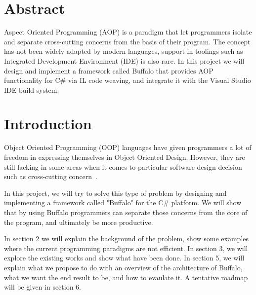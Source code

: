\newcommand{\etc} {\emph{etc.\/}}
\newcommand{\etal}{\emph{et~al.\/}}
\newcommand{\eg}  {\emph{e.g.\/}}
\newcommand{\ie}  {\emph{i.e.\/}}


\section*{Abstract}
Aspect Oriented Programming (AOP) is a paradigm that let programmers isolate and separate cross-cutting concerns from the basis of their program. The concept has not been widely adapted by modern languages, support in toolings such as Integrated Development Environment (IDE) is also rare. In this project we will design and implement a framework called Buffalo that provides AOP functionality for C\# via IL code weaving, and integrate it with the Visual Studio IDE build system.
\vfill{}

\setcounter{page}{0} 
\newpage{}
\section{Introduction}
Object Oriented Programming (OOP) languages have given programmers a lot of freedom in expressing themselves in Object Oriented Design. However, they are still lacking in some areas when it comes to particular software design decision such as cross-cutting concern~\cite{aop}. 

In this project, we will try to solve this type of problem by designing and implementing a framework called "Buffalo" for the C\# platform. We will show that by using Buffalo programmers can separate those concerns from the core of the program, and ultimately be more productive.

In section 2 we will explain the background of the problem, show some examples where the current programming paradigms are not efficient. In section 3, we will explore the existing works and show what have been done. In section 5, we will explain what we propose to do with an overview of the architecture of Buffalo, what we want the end result to be, and how to evaulate it. A tentative roadmap will be given in section 6.

